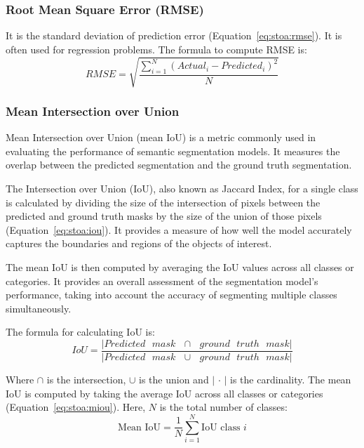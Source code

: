 \subsubsection{Root Mean Square Error (RMSE)}
It is the standard deviation of prediction error (Equation~\ref{eq:stoa:rmse}). It is often used for regression problems. The formula to compute RMSE is:
\begin{equation}
    \mathit{RMSE}=\sqrt{\frac{\sum_{i=1}^N(Actual_i-Predicted_i)^2}{N}}
    \label{eq:stoa:rmse}
\end{equation}

\subsubsection{Mean Intersection over Union}
Mean Intersection over Union (mean IoU) is a metric commonly used in evaluating the performance of semantic segmentation models. It measures the overlap between the predicted segmentation and the ground truth segmentation.

The Intersection over Union (IoU), also known as Jaccard Index, for a single class is calculated by dividing the size of the intersection of pixels between the predicted and ground truth masks by the size of the union of those pixels (Equation~\ref{eq:stoa:iou}). It provides a measure of how well the model accurately captures the boundaries and regions of the objects of interest.

The mean IoU is then computed by averaging the IoU values across all classes or categories. It provides an overall assessment of the segmentation model's performance, taking into account the accuracy of segmenting multiple classes simultaneously.

The formula for calculating IoU is:
\begin{equation}
    IoU = \frac{|\text{$Predicted$ $mask$ $\cap$ $ground$ $truth$ $mask$}|}{|\text{$Predicted$ $mask$ $\cup$ $ground$ $truth$ $mask$}|}
    \label{eq:stoa:iou}
\end{equation}

Where $\cap$ is the intersection, $\cup$ is the union and $|\,\cdot\,|$ is the cardinality.
The mean IoU is computed by taking the average IoU across all classes or categories (Equation~\ref{eq:stoa:miou}). Here, $N$ is the total number of classes:
\begin{equation}
    \text{Mean IoU} = \frac{1}{N}\sum_{i=1}^N \text{IoU class } i
    \label{eq:stoa:miou}
\end{equation}

